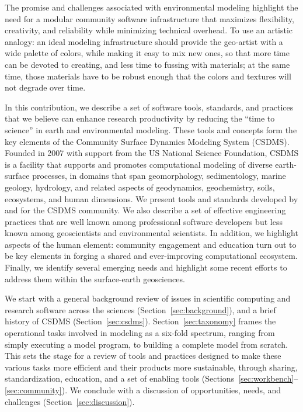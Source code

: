 \documentclass[12pt]{amsart}
\begin{document}
The promise and challenges associated with environmental modeling highlight the need for a modular community software infrastructure that maximizes flexibility, creativity, and reliability while minimizing technical overhead. To use an artistic analogy: an ideal modeling infrastructure should provide the geo-artist with a wide palette of colors, while making it easy to mix new ones, so that more time can be devoted to creating, and less time to fussing with materials; at the same time, those materials have to be robust enough that the colors and textures will not degrade over time.

In this contribution, we describe a set of software tools, standards, and practices that we believe can enhance research productivity by reducing the ``time to science'' in earth and environmental modeling. These tools and concepts form the key elements of the Community Surface Dynamics Modeling System (CSDMS). Founded in 2007 with support from the US National Science Foundation, CSDMS is a facility that supports and promotes computational modeling of diverse earth-surface processes, in domains that span geomorphology, sedimentology, marine geology, hydrology, and related aspects of geodynamics, geochemistry, soils, ecosystems, and human dimensions. We present tools and standards developed by and for the CSDMS community. We also describe a set of effective engineering practices that are well known among professional software developers but less known among geoscientists and environmental scientists. In addition, we highlight aspects of the human element: community engagement and education turn out to be key elements in forging a shared and ever-improving computational ecosystem. Finally, we identify several emerging needs and highlight some recent efforts to address them within the surface-earth geosciences.

We start with a general background review of issues in scientific computing and research software across the sciences (Section~\ref{sec:background}), and a brief history of CSDMS (Section~\ref{sec:csdms}). Section~\ref{sec:taxonomy} frames the operational tasks involved in modeling as a six-fold spectrum, ranging from simply executing a model program, to building a complete model from scratch. This sets the stage for a review of tools and practices designed to make these various tasks more efficient and their products more sustainable, through sharing, standardization, education, and a set of enabling tools (Sections~\ref{sec:workbench}--\ref{sec:community}). We conclude with a discussion of opportunities, needs, and challenges (Section~\ref{sec:discussion}).
\end{document}
